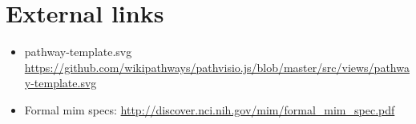 \documentclass[]{article}
\begin{document}
\newcommand{\docchapter}[1] {
\subsection{#1}
\subsubsection{Pathway snippet}
\texttt{[image: \#1.png]}
\subsubsection{Description}

\subsubsection{GPML}
\lstset{
  language=GPML,
}

\subsubsection{RDFSchema}
\texttt{[image: \#1.pdf]}
\subsubsection{RDF snippet (turtle)}
\lstset{
  language=ttl,
}


\subsubsection{Example SPARQL query}
\lstset{
  language=sparql,
}

\newpage
}




\section{External links}
\begin{itemize}
	\item pathway-template.svg \url{https://github.com/wikipathways/pathvisio.js/blob/master/src/views/pathway-template.svg}
	\item Formal mim specs: \url{http://discover.nci.nih.gov/mim/formal_mim_spec.pdf}
\end{itemize}
\end{document}
